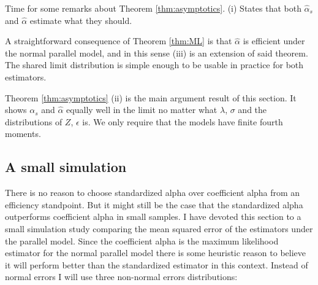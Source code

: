 \documentclass{article}
\theoremstyle{plain}
\theoremstyle{plain}
\theoremstyle{definition}
\theoremstyle{remark}
\theoremstyle{definition}
\theoremstyle{plain}
\theoremstyle{plain}
\theoremstyle{definition}
\begin{document}
Time for some remarks about Theorem \ref{thm:asymptotics}. (i) States that both $\hat{\alpha}_s$ and $\hat{\alpha}$ estimate what they should. 

A straightforward consequence of Theorem \ref{thm:ML} is that $\hat{\alpha}$ is efficient under the normal parallel model, and in this sense (iii) is an extension of said theorem. The shared limit distribution is simple enough to be usable in practice for both estimators. 

Theorem \ref{thm:asymptotics} (ii) is the main argument result of this section. It shows $\alpha_{s}$ and $\hat{\alpha}$ equally well in the limit no matter what $\lambda$, $\sigma$ and the distributions of $Z$, $\epsilon$ is. We only require that the models have finite fourth moments.

\subsection{A small simulation}
There is no reason to choose standardized alpha over coefficient alpha from an efficiency standpoint. But it might still be the case
that the standardized alpha outperforms coefficient alpha
in small samples. I have devoted this section to a small simulation
study comparing the mean squared error of the estimators under
the parallel model. Since the coefficient alpha is the maximum likelihood
estimator for the normal parallel model there is some heuristic reason
to believe it will perform better than the standardized estimator
in this context. Instead of normal errors I will use three non-normal
errors distributions:
\end{document}
